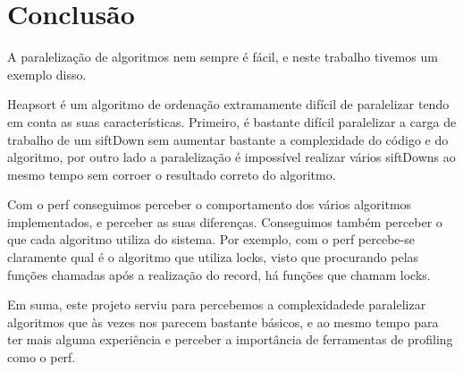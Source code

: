 \documentclass{article}
\begin{document}
\section{Conclusão}
\par A paralelização de algoritmos nem sempre é fácil, e neste trabalho tivemos um exemplo disso. 
\par Heapsort é um algoritmo de ordenação extramamente difícil de paralelizar tendo em conta as suas características. Primeiro, é bastante difícil paralelizar a carga de trabalho de um siftDown sem aumentar bastante a complexidade do código e do algoritmo, por outro lado a paralelização é impossível realizar vários siftDowns ao mesmo tempo sem corroer o resultado correto do algoritmo.
\par Com o perf conseguimos perceber o comportamento dos vários algoritmos implementados, e perceber as suas diferenças. Conseguimos também perceber o que cada algoritmo utiliza do sistema. Por exemplo, com o perf percebe-se claramente qual é o algoritmo que utiliza locks, visto que procurando pelas funções chamadas após a realização do record, há funções que chamam locks.
\par Em suma, este projeto serviu para percebemos a complexidadede paralelizar algoritmos que às vezes nos parecem bastante básicos, e ao mesmo tempo para ter mais alguma experiência e perceber a importância de ferramentas de profiling como o perf.

\clearpage
\end{document}
